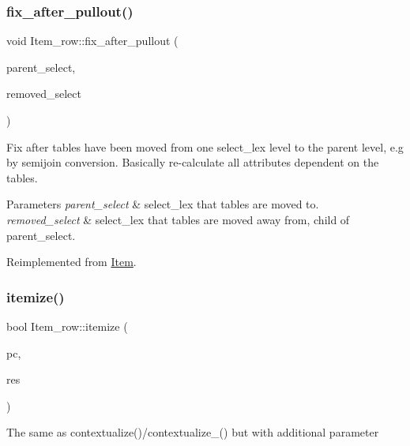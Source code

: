 \subsubsection{\texorpdfstring{fix\+\_\+after\+\_\+pullout()}{fix\_after\_pullout()}}
{\footnotesize\ttfamily void Item\+\_\+row\+::fix\+\_\+after\+\_\+pullout (\begin{DoxyParamCaption}\item[{st\+\_\+select\+\_\+lex $\ast$}]{parent\+\_\+select,  }\item[{st\+\_\+select\+\_\+lex $\ast$}]{removed\+\_\+select }\end{DoxyParamCaption})\hspace{0.3cm}{\ttfamily [virtual]}}

Fix after tables have been moved from one select\+\_\+lex level to the parent level, e.\+g by semijoin conversion. Basically re-\/calculate all attributes dependent on the tables.


\begin{DoxyParams}{Parameters}
{\em parent\+\_\+select} & select\+\_\+lex that tables are moved to. \\
\hline
{\em removed\+\_\+select} & select\+\_\+lex that tables are moved away from, child of parent\+\_\+select. \\
\hline
\end{DoxyParams}


Reimplemented from \mbox{\hyperlink{classItem_a6e3c38497d210357a4f80a755fb7b61e}{Item}}.

\mbox{\label{classItem__row_af0e050bb8e5b8942ac7d27da01ab897b}} 
\subsubsection{\texorpdfstring{itemize()}{itemize()}}
{\footnotesize\ttfamily bool Item\+\_\+row\+::itemize (\begin{DoxyParamCaption}\item[{\mbox{\hyperlink{structParse__context}{Parse\+\_\+context}} $\ast$}]{pc,  }\item[{\mbox{\hyperlink{classItem}{Item}} $\ast$$\ast$}]{res }\end{DoxyParamCaption})\hspace{0.3cm}{\ttfamily [virtual]}}

The same as contextualize()/contextualize\+\_\+() but with additional parameter

